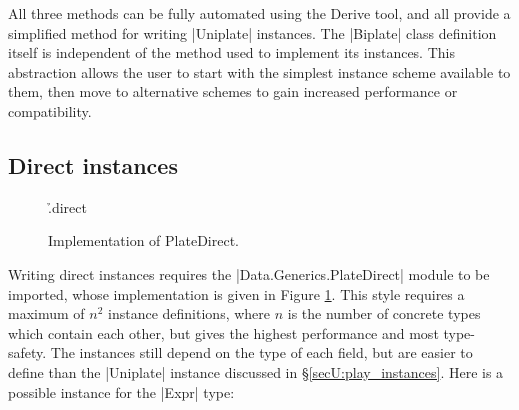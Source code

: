 All three methods can be fully automated using the Derive tool, and all provide a simplified method for writing |Uniplate| instances. The |Biplate| class definition itself is independent of the method used to implement its instances. This abstraction allows the user to start with the simplest instance scheme available to them, then move to alternative schemes to gain increased performance or compatibility.


\subsection{Direct instances}
\label{secU:implement_playdirect}

\begin{figure}
\ind{||*}\ind{||+}\ind{||-}\ind{||||*}\ind{||||+}
\h{.direct}
\caption{Implementation of PlateDirect.}
\label{figU:platedirect}
\end{figure}

Writing direct instances requires the |Data.Generics.PlateDirect| module to be imported, whose implementation is given in Figure \ref{figU:platedirect}. This style requires a maximum of $n^2$ instance definitions, where $n$ is the number of concrete types which contain each other, but gives the highest performance and most type-safety. The instances still depend on the type of each field, but are easier to define than the |Uniplate| instance discussed in \S\ref{secU:play_instances}. Here is a possible instance for the |Expr| type:

